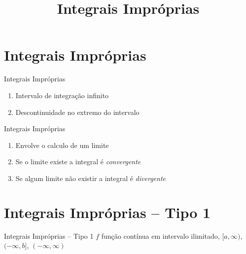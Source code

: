 
\usepackage{integracao_e_series}

\title{Integrais Impróprias}



\addtitle

\section{Integrais Impróprias}

\begin{frame}{Integrais Impróprias}
\begin{enumerate}[<+->]
  \setlength\itemsep{1em}
  \item Intervalo de integração infinito
  \item Descontinuidade no extremo do intervalo
\end{enumerate}
\end{frame}

\begin{frame}{Integrais Impróprias}
\begin{enumerate}[<+->]
  \setlength\itemsep{1em}
  \item Envolve o calculo de um limite
  \item Se o limite existe a integral é \emph{convergente}
  \item Se algum limite não existir a integral é \emph{divergente}
\end{enumerate}
\end{frame}

\section{Integrais Impróprias -- Tipo 1}

\begin{frame}{Integrais Impróprias -- Tipo 1}
  $f$ função contínua em intervalo ilimitado,
  \emph{\([a, \infty)\)},
  \emph{\((-\infty, b]\)},
  \emph{\((-\infty, \infty)\)}
\end{frame}

